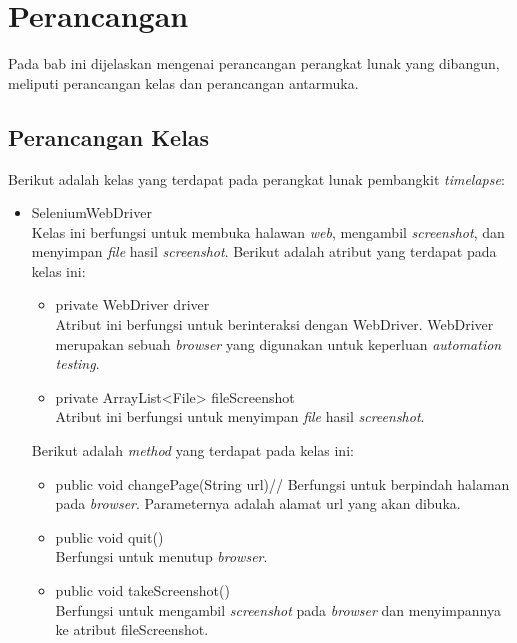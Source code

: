 \chapter{Perancangan}
\label{chap:Perancangan}

Pada bab ini dijelaskan mengenai perancangan perangkat lunak yang dibangun, meliputi perancangan kelas dan perancangan antarmuka.

\section{Perancangan Kelas}
\label{sec:perancangan_kelas}
Berikut adalah kelas yang terdapat pada perangkat lunak pembangkit \textit{timelapse}:
\begin{itemize}
\item SeleniumWebDriver\\
Kelas ini berfungsi untuk membuka halawan \textit{web}, mengambil \textit{screenshot}, dan menyimpan \textit{file} hasil \textit{screenshot}. Berikut adalah atribut yang terdapat pada kelas ini:
\begin{itemize}
   \item private WebDriver driver\\
   Atribut ini berfungsi untuk berinteraksi dengan WebDriver. WebDriver merupakan sebuah \textit{browser} yang digunakan untuk keperluan \textit{automation testing}.
    \item private ArrayList<File> fileScreenshot\\
	Atribut ini berfungsi untuk menyimpan \textit{file} hasil \textit{screenshot}.
\end{itemize}

Berikut adalah \textit{method} yang terdapat pada kelas ini:
\begin{itemize}
   
  \item public void changePage(String url)//
  Berfungsi untuk berpindah halaman pada \textit{browser}. Parameternya adalah alamat url yang akan dibuka.
  \item public void quit()\\
  Berfungsi untuk menutup \textit{browser}.
  \item public void takeScreenshot()\\
  Berfungsi untuk mengambil \textit{screenshot} pada \textit{browser} dan menyimpannya ke atribut fileScreenshot.
\end{itemize}


\end{itemize}
